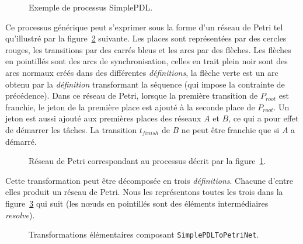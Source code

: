 \begin{figure}[h] 
  \begin{center}
    
    \caption{Exemple de processus SimplePDL.}
    \label{fig:simplesimplepdlprocess}
  \end{center}
\end{figure}

Ce processus générique peut s'exprimer sous la forme d'un réseau de Petri tel
qu'illustré par la figure~\ref{fig:simplepetrinetprocess} suivante. Les places
sont représentées par des cercles rouges, les transitions par des carrés bleus
et les arcs par des flèches. %
Les flèches en pointillés sont des arcs de synchronisation, celles en trait
plein noir sont des arcs normaux créés dans des différentes \emph{définitions},
la flèche verte est un arc obtenu par la \emph{définition} transformant la
séquence (qui impose la contrainte de précédence). Dans ce réseau de Petri,
lorsque la première transition de $P_{root}$ est franchie, le jeton de la
première place est ajouté à la seconde place de $P_{root}$. Un jeton est aussi
ajouté aux premières places des réseaux $A$ et $B$, ce qui a pour effet de
démarrer les tâches. La transition $t_{finish}$ de $B$ ne peut être franchie
que si $A$ a démarré.

\begin{figure}[h]
  \begin{center}
    
    \caption{Réseau de Petri correspondant au processus décrit par la
      figure~\ref{fig:simplesimplepdlprocess}.}
    \label{fig:simplepetrinetprocess}
  \end{center}
\end{figure}

Cette transformation peut être décomposée en trois \emph{définitions}. Chacune
d'entre elles produit un réseau de Petri. Nous les représentons toutes les
trois dans la figure~\ref{fig:atomicpn} qui suit (les nœuds en pointillés sont
des éléments intermédiaires \emph{resolve}). 

\begin{figure}
  \begin{center}
    
    \caption{Transformations élémentaires composant \texttt{SimplePDLToPetriNet}.}
    \label{fig:atomicpn}
  \end{center}
\end{figure}


